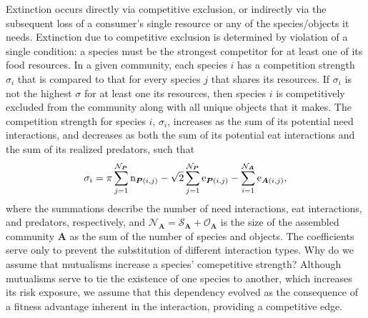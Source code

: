 \documentclass[twocolumn,preprintnumbers,amsmath,amssymb,superscriptaddress]{revtex4}
\newcommand{\rr}[1]{{\rm #1}}
\begin{document}

Extinction occurs directly via competitive exclusion, or indirectly via the subsequent loss of a consumer's single resource or any of the species/objects it needs.
Extinction due to competitive exclusion is determined by violation of a single condition: a species must be the strongest competitor for at least one of its food resources.
In a given community, each species $i$ has a competition strength $\sigma_i$ that is compared to that for every species $j$ that shares its resources.
If $\sigma_i$ is not the highest $\sigma$ for at least one its resources, then species $i$ is competitively excluded from the community along with all unique objects that it makes.
The competition strength for species $i$, $\sigma_i$, increases as the sum of its potential need interactions, and decreases as both the sum of its potential eat interactions and the sum of its realized predators, such that 
\begin{equation}
  \sigma_i = \pi \sum_{j=1}^{\mathcal{N}_{\bm P}} \rr{n}_{{\bm P}(i,j)} - \sqrt{2}\sum_{j=1}^{\mathcal{N}_{\bm P}} \rr{e}_{{\bm P}(i,j)} - \sum_{i=1}^{\mathcal{N}_{\bm A}} \rr{e}_{{\bm A}(i,j)},
\end{equation}
where the summations describe the number of need interactions, eat interactions, and predators, respectively, and $\mathcal{N}_{\bm A} = \mathcal{S}_{\bm A} + \mathcal{O}_{\bm A}$ is the size of the assembled community $\bm A$ as the sum of the number of species and objects. 
The coefficients serve only to prevent the substitution of different interaction types.
Why do we assume that mutualisms increase a species' comepetitive strength?
Although mutualisms serve to tie the existence of one species to another, which increases its risk exposure, we assume that this dependency evolved as the consequence of a fitness advantage inherent in the interaction, providing a competitive edge.
\end{document}
